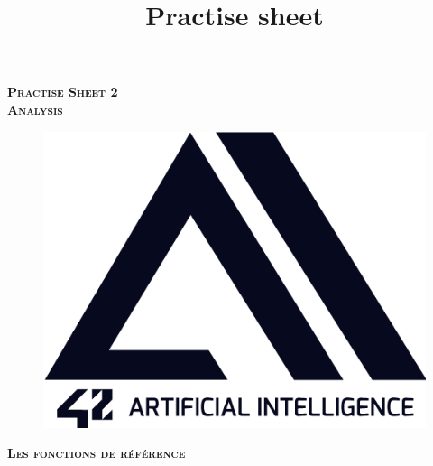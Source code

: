 \documentclass[11pt, french]{article}
\author{} %
\title{Practise sheet}
\begin{document}
\vspace*{2cm}
\begin{center}
    \textsc{\fontsize{40}{48} \bfseries Practise Sheet 2}\\[0.6cm]
    \textsc{\fontsize{40}{48} \bfseries Analysis}\\[0.3cm]
\end{center}
\vspace{3cm}

\begin{figure}[!h]
\center
\includegraphics[scale=0.5]{logo-42-ai.png}
\label{fig:1st_page_logo_42ai}
\end{figure}

\vspace*{2cm}
\begin{center}
    \textsc{\fontsize{32}{48} \bfseries Les fonctions de référence}\\[0.6cm]
\end{center}
\vspace{3cm}

\newpage


\end{document}

